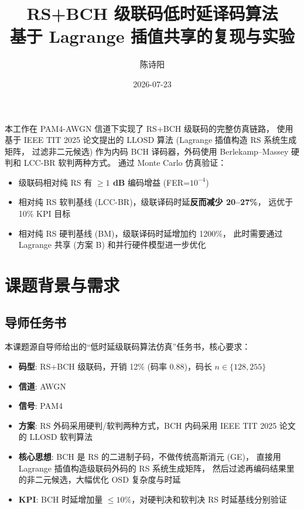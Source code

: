 \documentclass[11pt,a4paper]{article}
\title{RS+BCH 级联码低时延译码算法\\
       {\large 基于 Lagrange 插值共享的复现与实验}}
\author{陈诗阳}
\date{2026-07-23}
\begin{document}
\maketitle

\begin{keybox}[title=\textbf{摘要}]
本工作在 PAM4-AWGN 信道下实现了 RS+BCH 级联码的完整仿真链路，
使用基于 IEEE TIT 2025 论文提出的 LLOSD 算法 (Lagrange 插值构造 RS 系统生成矩阵，
过滤非二元候选) 作为内码 BCH 译码器，外码使用 Berlekamp--Massey 硬判和 LCC-BR 软判两种方式。
通过 Monte Carlo 仿真验证：
\begin{itemize}[leftmargin=1.5em, itemsep=1pt, topsep=2pt]
\item 级联码相对纯 RS 有 \textbf{$\geq 1$ dB} 编码增益 (FER=$10^{-4}$)
\item 相对纯 RS 软判基线 (LCC-BR)，级联译码时延\textbf{反而减少 20--27\%}，
     远优于 10\% KPI 目标
\item 相对纯 RS 硬判基线 (BM)，级联译码时延增加约 1200\%，
     此时需要通过 Lagrange 共享 (方案 B) 和并行硬件模型进一步优化
\end{itemize}
\end{keybox}

\tableofcontents

\section{课题背景与需求}

\subsection{导师任务书}

本课题源自导师给出的``低时延级联码算法仿真''任务书，核心要求：

\begin{itemize}[leftmargin=1.5em]
\item \textbf{码型}: RS+BCH 级联码，开销 12\% (码率 0.88)，码长 $n \in \{128, 255\}$
\item \textbf{信道}: AWGN
\item \textbf{信号}: PAM4
\item \textbf{方案}: RS 外码采用硬判/软判两种方式，BCH 内码采用 IEEE TIT 2025 论文的 LLOSD 软判算法
\item \textbf{核心思想}: BCH 是 RS 的二进制子码，不做传统高斯消元 (GE)，
   直接用 Lagrange 插值构造级联码外码的 RS 系统生成矩阵，
   然后过滤再编码结果里的非二元候选，大幅优化 OSD 复杂度与时延
\item \textbf{KPI}: BCH 时延增加量 $\leq 10\%$，对硬判决和软判决 RS 时延基线分别验证
\end{itemize}
\end{document}
